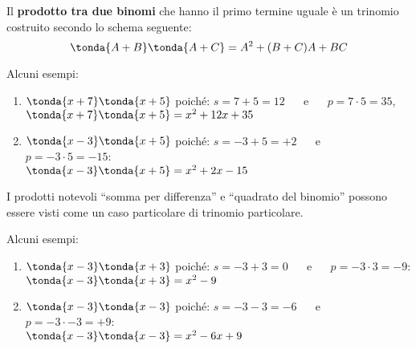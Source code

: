 \begin{definizione}{}{} 
Il \textbf{prodotto tra due binomi} che hanno il primo termine
uguale è un trinomio costruito 
secondo lo schema seguente:
\[\tonda{A+B}\tonda{A+C} = A^{2} + (B+C)A + BC\]
\end{definizione}

\begin{esempio}{}{}
Alcuni esempi:
\begin{enumerate}
\item \(\tonda{x+7} \tonda{x+5}\) \quad poiché: \quad 
\(s=7+5=12\) ~~ e ~~ \(p=7 \cdot 5=35\), \\ 
\(\tonda{x+7} \tonda{x+5}=x^2+12x+35\)
\item \(\tonda{x-3} \tonda{x+5}\) \quad poiché: \quad 
\(s=-3+5=+2\) ~~ e ~~ \(p=-3 \cdot 5=-15\):\\ 
\(\tonda{x-3} \tonda{x+5}=x^2+2x-15\)
\end{enumerate}
\end{esempio}

\begin{osservazione}{}{}
I prodotti notevoli ``somma per differenza'' e ``quadrato del binomio'' 
possono essere visti come un caso particolare di trinomio particolare.
\end{osservazione}

\begin{esempio}{}{}
Alcuni esempi:
\begin{enumerate}
\item \(\tonda{x-3} \tonda{x+3}\) \quad poiché: \quad 
\(s=-3+3=0\) ~~ e ~~ \(p=-3 \cdot 3 = -9\): \\ 
\(\tonda{x-3} \tonda{x+3}=x^2-9\)
\item \(\tonda{x-3} \tonda{x-3}\) \quad poiché: \quad 
\(s=-3-3=-6\) ~~ e ~~ \(p=-3 \cdot -3 = +9\): \\ 
\(\tonda{x-3} \tonda{x-3}=x^2-6x+9\)
\end{enumerate}
\end{esempio}

